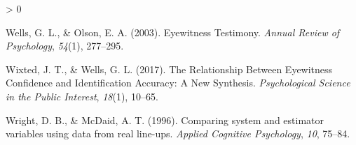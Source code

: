 \documentclass[
  10pt,
  dvipsnames,enabledeprecatedfontcommands]{scrartcl}
\newlength{\cslhangindent}
\newenvironment{CSLReferences}[2] %
 {%
  \setlength{\parindent}{0pt}
  \ifodd #1 \everypar{\setlength{\hangindent}{\cslhangindent}}\ignorespaces\fi
  \ifnum #2 > 0
  \setlength{\parskip}{#2\baselineskip}
  \fi
 }%
 {}
\begin{document}
\begin{CSLReferences}{1}{0}
\leavevmode\hypertarget{ref-wells2003EyewitnessTestimony}{}%
Wells, G. L., \& Olson, E. A. (2003). Eyewitness {Testimony}.
\emph{Annual Review of Psychology}, \emph{54}(1), 277--295.

\leavevmode\hypertarget{ref-wixted2017RelationshipEyewitnessConfidence}{}%
Wixted, J. T., \& Wells, G. L. (2017). The {Relationship Between
Eyewitness Confidence} and {Identification Accuracy}: {A New Synthesis}.
\emph{Psychological Science in the Public Interest}, \emph{18}(1),
10--65.

\leavevmode\hypertarget{ref-Wright1996ComparingSystemEstimator}{}%
Wright, D. B., \& McDaid, A. T. (1996). Comparing system and estimator
variables using data from real line-ups. \emph{Applied Cognitive
Psychology}, \emph{10}, 75--84.

\end{CSLReferences}
\end{document}
